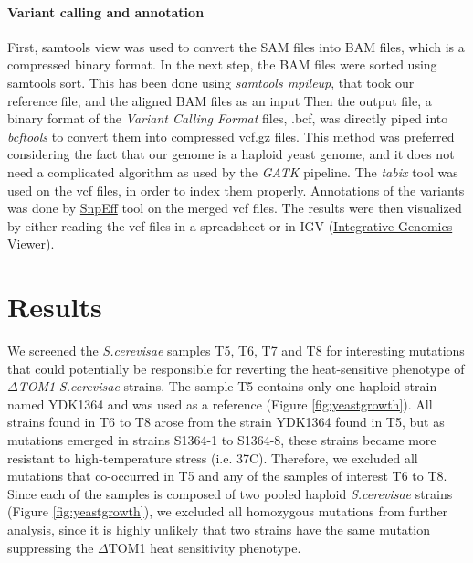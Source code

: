 \documentclass[10pt,a4paper]{article}
\begin{document}
\paragraph{Variant calling and annotation}
First, samtools view was used to convert the SAM files into BAM files, which is a compressed binary format. In the next step, the BAM files were sorted using samtools sort. This has been done using \textit{samtools mpileup}, that took our reference file, and the aligned BAM files as an input Then the output file, a binary format of the \textit{Variant Calling Format} files, .bcf, was directly piped into \textit{bcftools} to convert them into compressed vcf.gz files. This method was preferred considering the fact that our genome is a haploid yeast genome, and it does not need a complicated algorithm as used by the \textit{GATK} pipeline. The \textit{tabix}\cite{li_tabix:_2011} tool was used on the vcf files, in order to index them properly. Annotations of the variants was done by \href{http://snpeff.sourceforge.net/}{SnpEff} tool on the merged vcf files. The results were then visualized by either reading the vcf files in a spreadsheet or in IGV (\href{http://software.broadinstitute.org/software/igv/}{Integrative Genomics Viewer}).\\



\section*{\large Results}
We screened the \textit{S.cerevisae} samples T5, T6, T7 and T8 for interesting mutations that could potentially be responsible for reverting the heat-sensitive phenotype of \textit{$\Delta$TOM1} \textit{S.cerevisae} strains. The sample T5 contains only one haploid strain named YDK1364 and was used as a reference (Figure \ref{fig:yeastgrowth}). All strains found in T6 to T8 arose from the strain YDK1364 found in T5, but as mutations emerged in strains S1364-1 to S1364-8, these strains became more resistant to high-temperature stress (i.e. 37\degree C). Therefore, we excluded all mutations that co-occurred in T5 and any of the samples of interest T6 to T8. Since each of the samples is composed of two pooled haploid \textit{S.cerevisae} strains (Figure \ref{fig:yeastgrowth}), we excluded all homozygous mutations from further analysis, since it is highly unlikely that two strains have the same mutation suppressing the $\Delta$TOM1 heat sensitivity phenotype.
\end{document}
